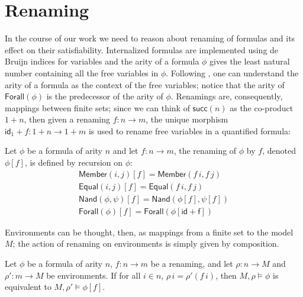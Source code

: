 \section{Renaming}
\newcommand{\renaming}[2]{#1[#2]}
\newcommand{\inFm}[2]{\mathsf{Member}(#1,#2)}
\newcommand{\eqFm}[2]{\mathsf{Equal}(#1,#2)}
\newcommand{\nandFm}[2]{\mathsf{Nand}(#1,#2)}
\newcommand{\forallFm}[1]{\mathsf{Forall(#1)}}

In the course of our work we need to reason about renaming of formulas
and its effect on their satisfiability. Internalized formulas are
implemented using de Bruijn indices for variables and the arity of a
formula $\phi$ gives the least natural number containing all the free
variables in $\phi$. Following \citet{fiore-abssyn}, one can
understand the arity of a formula as the context of the free
variables; notice that the arity of $\forallFm{\phi}$ is the
predecessor of the arity of $\phi$. Renamings are, consequently,
mappings between finite sets; since we can think of $\mathsf{succ}(n)$
as the co-product $1+n$, then given a renaming $f \colon n \to m$, the
unique morphism $\mathsf{id}_1+f \colon 1+n \to 1+m$ is used to
rename free variables in a quantified formula:

\begin{definition}[Renaming]
  Let $\phi$ be a formula of arity $n$ and let $f \colon n \to m$, the
  renaming of $\phi$ by $f$, denoted $\renaming{\phi}{f}$, is defined
  by recursion on $\phi$:
  \begin{gather*}
    \renaming{\inFm{i}{j}}{f} = \inFm{f\,i}{f\,j}\\
    \renaming{\eqFm{i}{j}}{f} = \eqFm{f\,i}{f\,j}\\
    \renaming{\nandFm{\phi}{\psi}}{f} = \nandFm{\renaming{\phi}{f}}{\renaming{\psi}{f}}\\
    \renaming{\forallFm{\phi}}{f} = \forallFm{\renaming{\phi}{\mathsf{id}+f}}
  \end{gather*}
\end{definition}

Environments can be thought, then, as mappings from a finite set to
the model $M$; the action of renaming on environments is simply given
by composition.

\begin{lemma}
  Let $\phi$ be a formula of arity $n$, $f \colon n \to m$ be a
  renaming, and let $\rho \colon n \to M$ and $\rho' \colon m \to M$
  be environments. If for all $i \in n$, $\rho\,i = \rho'(f\,i)$, then
  $M,\rho\models \phi$ is equivalent to
  $M,\rho' \models \renaming{\phi}{f}$.
\end{lemma}


